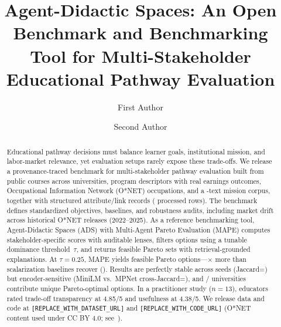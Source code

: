 \documentclass[sigconf,review]{acmart}
\title{Agent-Didactic Spaces: An Open Benchmark and Benchmarking Tool for Multi-Stakeholder Educational Pathway Evaluation}
\author{First Author}
\affiliation{%
  \institution{Institution}
  \city{City}
  \country{Country}
}
\author{Second Author}
\affiliation{%
  \institution{Institution}
  \city{City}
  \country{Country}
}
\newcommand{\BenchmarkURL}{\texttt{[REPLACE\_WITH\_DATASET\_URL]}}
\newcommand{\CodeURL}{\texttt{[REPLACE\_WITH\_CODE\_URL]}}
\newcommand{\ADS}{\textsc{ADS}\xspace}
\newcommand{\MAPE}{\textsc{MAPE}\xspace}
\newcommand{\IndustryPartner}{\textit{industry partner (anonymized)}}
\begin{document}
\begin{abstract}
Educational pathway decisions must balance learner goals, institutional mission, and labor-market relevance, yet evaluation setups rarely expose these trade-offs.
We release a provenance-traced benchmark for multi-stakeholder pathway evaluation built from \NumCourses{} public courses across {\NumUniversities} universities, \NumPrograms{} program descriptors with real earnings outcomes, \NumOccupations{} Occupational Information Network (O*NET) occupations, and a \NumMissionsExpanded-text mission corpus, together with \NumAttributeRecords{} structured attribute/link records (\NumProcessedRows{} processed rows).
The benchmark defines standardized objectives, baselines, and robustness audits, including market drift across historical O*NET releases (2022--2025).
As a reference benchmarking tool, Agent-Didactic Spaces (\ADS) with Multi-Agent Pareto Evaluation (\MAPE) computes stakeholder-specific scores with auditable lenses, filters options using a tunable dominance threshold~$\tau$, and returns feasible Pareto sets with retrieval-grounded explanations.
At $\tau{=}0.25$, \MAPE yields \MainParetoSize{} feasible Pareto options---{\ParetoVsBaselineRatio}$\times$ more than scalarization baselines recover ({\BaselineOptima}).
Results are perfectly stable across seeds (Jaccard={\SeedStabilityJaccard}) but encoder-sensitive (MiniLM vs.\ MPNet cross-Jaccard={\CrossEncoderJaccard}), and {\NumUnisContributing}/{\NumUniversities} universities contribute unique Pareto-optimal options.
In a practitioner study ($n{=}13$), educators rated trade-off transparency at {4.85/5} and usefulness at {4.38/5}.
We release data and code at \BenchmarkURL{} and \CodeURL{} (O*NET content used under CC BY 4.0; see~\cite{onet_license_db}).
\end{abstract}


\maketitle


\end{document}
